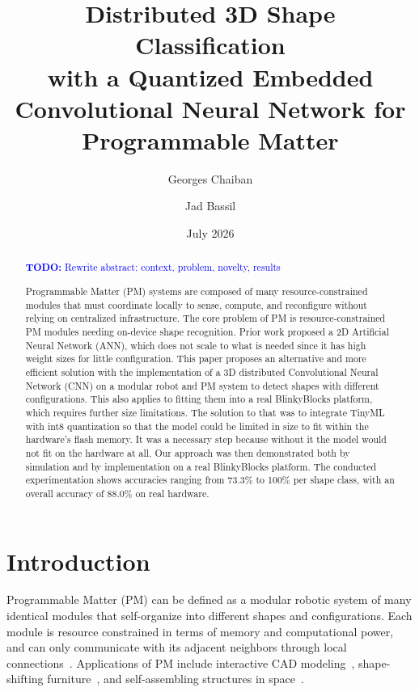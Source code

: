 \documentclass[12pt]{article}
\title{Distributed 3D Shape Classification\\ with a Quantized Embedded Convolutional Neural Network for Programmable Matter}
\author{Georges Chaiban \and Jad Bassil}
\date{July 2026}
\newcommand{\todo}[1]{\textcolor{blue}{\textbf{TODO:} #1}}
\begin{document}
\maketitle
\begin{abstract}

\todo{Rewrite abstract: context, problem, novelty, results}

Programmable Matter (PM) systems are composed of many resource-constrained modules that must coordinate locally to sense, compute, and reconfigure without relying on centralized infrastructure. The core problem of PM is resource-constrained PM modules needing on-device shape recognition. Prior work proposed a 2D Artificial Neural Network (ANN), which does not scale to what is needed since it has high weight sizes for little configuration. This paper proposes an alternative and more efficient solution with the implementation of a 3D distributed Convolutional Neural Network (CNN) on a modular robot and PM system to detect shapes with different configurations. This also applies to fitting them into a real BlinkyBlocks platform, which requires further size limitations. The solution to that was to integrate TinyML with int8 quantization so that the model could be limited in size to fit within the hardware's flash memory. It was a necessary step because without it the model would not fit on the hardware at all. Our approach was then demonstrated both by simulation and by implementation on a real BlinkyBlocks platform. The conducted experimentation shows accuracies ranging from 73.3\% to 100\% per shape class, with an overall accuracy of 88.0\% on real hardware.

\end{abstract}

\section{Introduction}
\label{sec:introduction}


Programmable Matter (PM) can be defined as a modular robotic system of many identical modules that self-organize into different shapes and configurations. Each module is resource constrained in terms of memory and computational power, and can only communicate with its adjacent neighbors through local connections~\cite{Bourgeois2017}. Applications of PM include interactive CAD modeling~\cite{Bourgeois2017}, shape-shifting furniture~\cite{hauser2020roombots}, and self-assembling structures in space~\cite{postModularityFutureSpace2021}.
\end{document}
